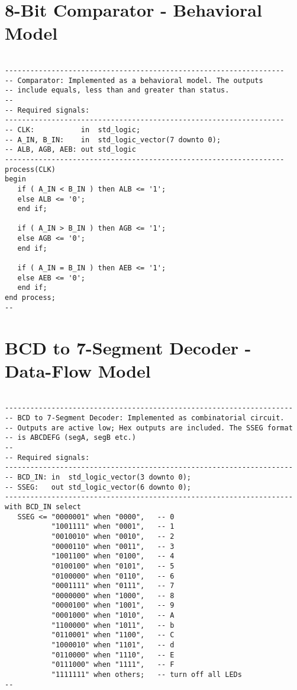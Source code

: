 \section{8-Bit Comparator - Behavioral Model}

\noindent
\begin{minipage}{0.99\linewidth}
\begin{lstlisting}

------------------------------------------------------------------
-- Comparator: Implemented as a behavioral model. The outputs 
-- include equals, less than and greater than status.  
-- 
-- Required signals: 
------------------------------------------------------------------
-- CLK:           in  std_logic;
-- A_IN, B_IN:    in  std_logic_vector(7 downto 0);
-- ALB, AGB, AEB: out std_logic
------------------------------------------------------------------
process(CLK)
begin
   if ( A_IN < B_IN ) then ALB <= '1';
   else ALB <= '0';
   end if;
    
   if ( A_IN > B_IN ) then AGB <= '1';
   else AGB <= '0';
   end if;
    
   if ( A_IN = B_IN ) then AEB <= '1';
   else AEB <= '0';
   end if;    
end process;
--
\end{lstlisting}
\end{minipage}

\section{BCD to 7-Segment Decoder - Data-Flow Model}

\noindent
\begin{minipage}{0.99\linewidth}
\begin{lstlisting}

--------------------------------------------------------------------
-- BCD to 7-Segment Decoder: Implemented as combinatorial circuit.  
-- Outputs are active low; Hex outputs are included. The SSEG format
-- is ABCDEFG (segA, segB etc.)
--
-- Required signals: 
--------------------------------------------------------------------
-- BCD_IN: in  std_logic_vector(3 downto 0);
-- SSEG:   out std_logic_vector(6 downto 0); 
--------------------------------------------------------------------
with BCD_IN select
   SSEG <= "0000001" when "0000",   -- 0
           "1001111" when "0001",   -- 1
           "0010010" when "0010",   -- 2
           "0000110" when "0011",   -- 3
           "1001100" when "0100",   -- 4
           "0100100" when "0101",   -- 5
           "0100000" when "0110",   -- 6
           "0001111" when "0111",   -- 7
           "0000000" when "1000",   -- 8
           "0000100" when "1001",   -- 9
           "0001000" when "1010",   -- A
           "1100000" when "1011",   -- b
           "0110001" when "1100",   -- C
           "1000010" when "1101",   -- d
           "0110000" when "1110",   -- E
           "0111000" when "1111",   -- F
           "1111111" when others;   -- turn off all LEDs
--
\end{lstlisting}
\end{minipage}

